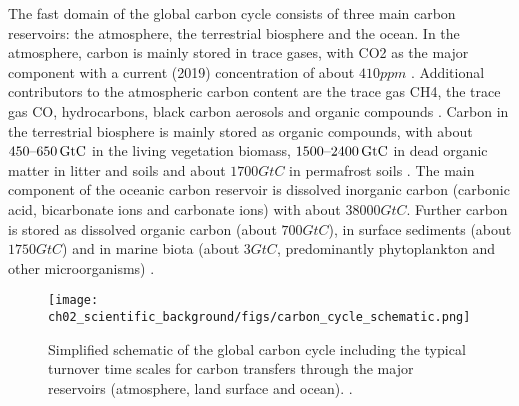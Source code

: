 The fast domain of the global carbon cycle consists of three main carbon
reservoirs: the atmosphere, the terrestrial biosphere and the ocean. In the
atmosphere, carbon is mainly stored in trace gases, with \ac{CO2} as the major
component with a current (2019) concentration of about $410 \unit{ppm}$
\autocite{Friedlingstein2020}. Additional contributors to the atmospheric
carbon content are the trace gas \ac{CH4}, the trace gas \ac{CO}, hydrocarbons,
black carbon aerosols and organic compounds \autocite{Ciais2013}. Carbon in the
terrestrial biosphere is mainly stored as organic compounds, with about
$\range{450}{650} \unit{GtC}$ in the living vegetation biomass,
$\range{1500}{2400} \unit{GtC}$ in dead organic matter in litter and soils and
about $1700 \unit{GtC}$ in permafrost soils \autocite{Ciais2013}. The main
component of the oceanic carbon reservoir is dissolved inorganic carbon
(carbonic acid, bicarbonate ions and carbonate ions) with about $38000
\unit{GtC}$. Further carbon is stored as dissolved organic carbon (about $700
\unit{GtC}$), in surface sediments (about $1750 \unit{GtC}$) and in marine
biota (about $3 \unit{GtC}$, predominantly phytoplankton and other
microorganisms) \autocite{Ciais2013, Friedlingstein2020}.

\begin{figure}[t]
  \centering
  \texttt{[image: 
    ch02\_scientific\_background/figs/carbon\_cycle\_schematic.png]}
  \caption{Simplified schematic of the global carbon cycle including the
    typical turnover time scales for carbon transfers through the major
    reservoirs (atmosphere, land surface and ocean).
    .}
  \label{fig:02:carbon_cycle_schematic}
\end{figure}

